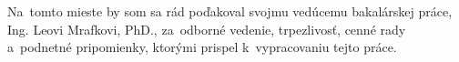 Na~tomto mieste by som sa rád poďakoval svojmu vedúcemu bakalárskej práce, 
Ing. Leovi Mrafkovi, PhD., za~odborné vedenie, trpezlivosť, cenné rady 
a~podnetné pripomienky, ktorými prispel k~vypracovaniu tejto práce.